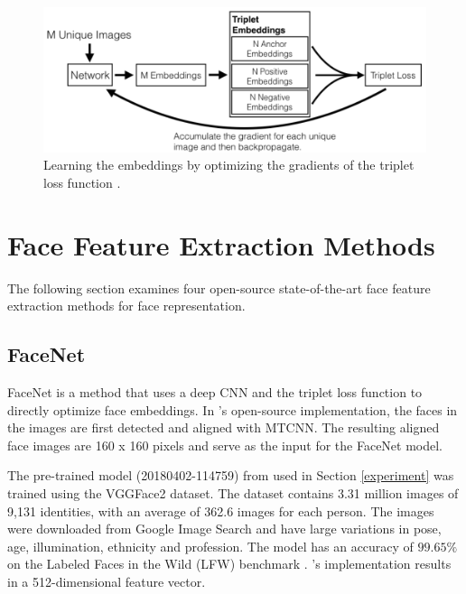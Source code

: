 \documentclass[12pt,english]{article}
\begin{document}
\begin{figure}[!tbp]
 \centering
    \includegraphics[width=0.6\columnwidth]{figures/openface_architecture.png}
    \caption{Learning the embeddings by optimizing the gradients of the triplet loss function \cite{amos}.}
	\label{fig:loss}
\end{figure}
 
\section{Face Feature Extraction Methods}
\label{facemethod}

The following section examines four open-source state-of-the-art face feature extraction methods for face representation.

\subsection{FaceNet}
\quad
FaceNet is a method that uses a deep CNN and the triplet loss function to directly optimize face embeddings. In \cite{sandberg}'s open-source implementation, the faces in the images are first detected and aligned with MTCNN. The resulting aligned face images are 160 x 160 pixels and serve as the input for the FaceNet model. %


The pre-trained model (20180402-114759) from \cite{sandberg} used in Section \ref{experiment} was trained using the VGGFace2 dataset. The dataset contains 3.31 million images of 9,131 identities, with an average of 362.6 images for each person. The images were downloaded from Google Image Search and have large variations in pose, age, illumination, ethnicity and profession. The model has an accuracy of $99.65\%$ on the Labeled Faces in the Wild (LFW) benchmark \cite{sandberg}. \cite{sandberg}'s implementation results in a 512-dimensional feature vector.
\end{document}
